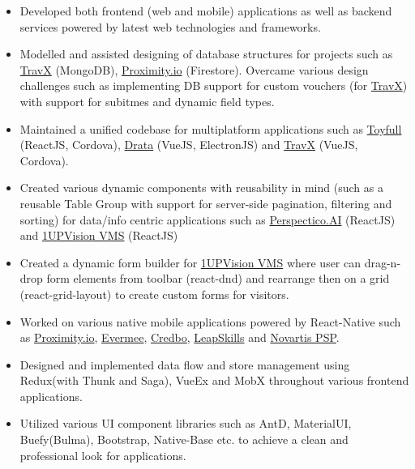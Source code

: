 \documentclass[10pt,a4paper,ragged2e]{maltacv}
\begin{document}
\begin{itemize}
  \item Developed both frontend (web and mobile) applications as well as backend services powered by latest web technologies and frameworks.
  \item Modelled and assisted designing of database structures for projects such as \href{https://play.google.com/store/apps/details?id=com.travx.app}{TravX} (MongoDB), \href{https://prox.io/}{Proximity.io} (Firestore). Overcame various design challenges such as implementing DB support for custom vouchers (for \href{https://play.google.com/store/apps/details?id=com.travx.app}{TravX}) with support for subitmes and dynamic field types. 
  \item Maintained a unified codebase for multiplatform applications such as \href{https://toyfull-app.web.app/}{Toyfull} (ReactJS, Cordova), \href{https://drata.com/}{Drata} (VueJS, ElectronJS) and \href{https://play.google.com/store/apps/details?id=com.travx.app}{TravX} (VueJS, Cordova).
  \item Created various dynamic components with reusability in mind (such as a reusable Table Group with support for server-side pagination, filtering and sorting) for data/info centric applications such as \href{https://www.perspectico.com/}{Perspectico.AI} (ReactJS) and \href{https://www.1upvision.com/}{1UPVision VMS} (ReactJS)
  \item Created a dynamic form builder for \href{https://www.1upvision.com/}{1UPVision VMS} where user can drag-n-drop form elements from toolbar (react-dnd) and rearrange then on a grid (react-grid-layout) to create custom forms for visitors.
  \item Worked on various native mobile applications powered by React-Native such as \href{https://prox.io/}{Proximity.io}, \href{https://play.google.com/store/apps/details?id=com.evermee}{Evermee}, \href{https://www.credbo.com/}{Credbo}, \href{https://play.google.com/store/apps/details?id=com.leap.skills}{LeapSkills} and \href{https://play.google.com/store/apps/details?id=com.novartispsp}{Novartis PSP}. 
  \item Designed and implemented data flow and store management using Redux(with Thunk and Saga), VueEx and MobX throughout various frontend applications.
  \item Utilized various UI component libraries such as AntD, MaterialUI, Buefy(Bulma), Bootstrap, Native-Base etc. to achieve a clean and professional look for applications. 

\end{itemize}
\end{document}
